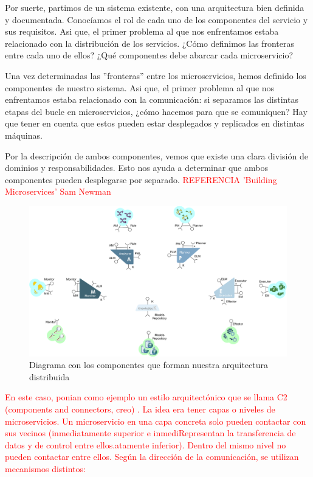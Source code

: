 Por suerte, partimos de un sistema existente, con una arquitectura bien definida y documentada. Conocíamos el rol de cada uno de los componentes del servicio y sus requisitos. Asi que, el primer problema al que nos enfrentamos estaba relacionado con la distribución de los servicios. ¿Cómo definimos las fronteras entre cada uno de ellos? ¿Qué componentes debe abarcar cada microservicio?

Una vez determinadas las ''fronteras'' entre los microservicios, hemos definido los componentes de nuestro sistema. Asi que, el primer problema al que nos enfrentamos estaba relacionado con la comunicación: si separamos las distintas etapas del bucle en microservicios, ¿cómo hacemos para que se comuniquen? Hay que tener en cuenta que estos pueden estar desplegados y replicados en distintas máquinas.

Por la descripción de ambos componentes, vemos que existe una clara división de dominios y responsabilidades. Esto nos ayuda a determinar que ambos componentes pueden desplegarse por separado. \textcolor{red}{REFERENCIA 'Building Microservices' Sam Newman}

\begin{figure}[htb]
  \centering
  \includegraphics[scale=0.3]{03_arquitectura/images/mape-k-microservices}
  \caption{Diagrama con los componentes que forman nuestra arquitectura distribuida}
  \label{fig:mape-k-microservices}
\end{figure}

\textcolor{red}{En este caso, ponian como ejemplo un estilo arquitectónico que se llama C2 (components and connectors, creo) . La idea era tener capas o niveles de microservicios. Un microservicio en una capa concreta solo pueden contactar con sus vecinos (inmediatamente superior e inmediRepresentan la transferencia de datos y de control entre ellos.atamente inferior). Dentro del mismo nivel no pueden contactar entre ellos. Según la dirección de la comunicación, se utilizan mecanismos distintos:}

